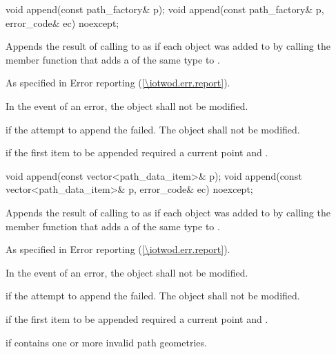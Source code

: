 \begin{itemdecl}
    void append(const path_factory& p);
    void append(const path_factory& p, error_code& ec) noexcept;
\end{itemdecl}
\begin{itemdescr}
\pnum
\effects
Appends the result of calling  to  as if each  object was added to  by calling the member function that adds a  of the same type to .

\pnum
\throws
As specified in Error reporting (\ref{\iotwod.err.report}).

\pnum
\remarks
In the event of an error, the object shall not be modified.

\pnum
\errors
{} if the attempt to append the  failed. The object shall not be modified.

\pnum
{} if the first item to be appended required a current point and .
\end{itemdescr}

\begin{itemdecl}
    void append(const vector<path_data_item>& p);
    void append(const vector<path_data_item>& p, error_code& ec) noexcept;
\end{itemdecl}
\begin{itemdescr}
\pnum
\effects
Appends the result of calling  to  as if each  object was added to  by calling the member function that adds a  of the same type to .

\pnum
\throws
As specified in Error reporting (\ref{\iotwod.err.report}).

\pnum
\remarks
In the event of an error, the object shall not be modified.

\pnum
\errors
{} if the attempt to append the  failed. The object shall not be modified.

\pnum
{} if the first item to be appended required a current point and .

\pnum
{} if  contains one or more invalid path geometries.
\end{itemdescr}

